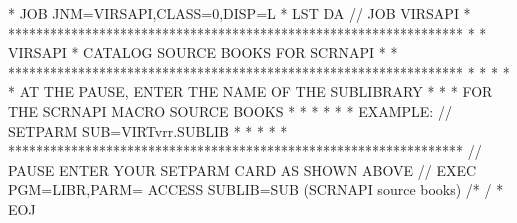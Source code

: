 \documentclass[letterpaper,10pt,english]{sphinxmanual}
\begin{document}

\begin{sphinxVerbatim}[commandchars=\\\{\}]
* \PYGZdl{}\PYGZdl{} JOB JNM=VIRSAPI,CLASS=0,DISP=L
* \PYGZdl{}\PYGZdl{} LST DA
// JOB VIRSAPI
* *****************************************************************
* * VIRSAPI * CATALOG SOURCE BOOKS FOR SCRNAPI                    *
* *****************************************************************
* *                                                               *
* * AT THE PAUSE, ENTER THE NAME OF THE SUB\PYGZhy{}LIBRARY               *
* * FOR THE SCRNAPI MACRO SOURCE BOOKS                            *
* *                                                               *
* * EXAMPLE: // SETPARM SUB=\PYGZsq{}VIRTvrr.SUBLIB\PYGZsq{}                      *
* *                                                               *
* *****************************************************************
// PAUSE ENTER YOUR SETPARM CARD AS SHOWN ABOVE
// EXEC PGM=LIBR,PARM=\PYGZsq{} ACCESS SUBLIB=\PYGZam{}SUB\PYGZsq{}
        (SCRNAPI source books)
/*
/\PYGZam{}
* \PYGZdl{}\PYGZdl{} EOJ
\end{sphinxVerbatim}

\end{document}
